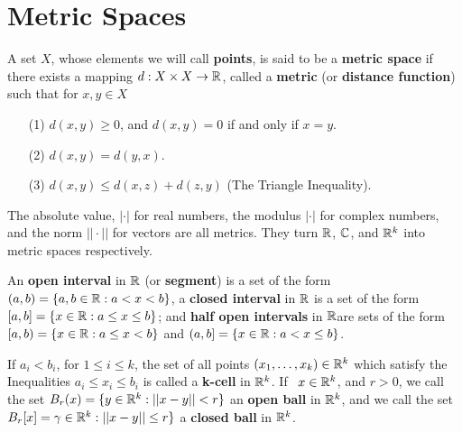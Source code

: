 
\section{Metric Spaces}

\begin{definition}
    A set $X$, whose elements we will call \textbf{points}, is said to be a \textbf{metric space}
    if there exists a mapping $d:X \times X \rightarrow \mathbb{R}$, called a \textbf{metric} (or
    \textbf{distance function}) such that for  $x,y \in X$
         \begin{enumerate}
             \item[(1)] $d(x,y) \geq 0$, and $d(x,y)=0$ if and only if $x=y$.

             \item[(2)] $d(x,y)=d(y,x)$.

             \item[(3)] $d(x,y) \leq d(x,z)+d(z,y)$ (The Triangle Inequality).
        \end{enumerate}
\end{definition}

\begin{example}
    The absolute value, $|\cdot|$ for real numbers, the modulus  $|\cdot|$ for
    complex numbers, and the norm $||\cdot||$ for vectors are all metrics. They
    turn  $\mathbb{R}$,  $\mathbb{C}$, and  $\mathbb{R}^k$ into metric spaces respectively.
\end{example}

\begin{definition}
    An \textbf{open interval} in $\mathbb{R}$ (or \textbf{segment}) is a set of the form $(a,b)=\{a,b \in \mathbb{R}: a<x<b\}$,
    a \textbf{closed interval} in $\mathbb{R}$ is a set of the form $[a,b]=\{x \in \mathbb{R}: a \leq x \leq b\}$; and
    \textbf{half open intervals} in $\mathbb{R} $are sets of the form  $[a,b)=\{x \in \mathbb{R}: a \leq x <b\}$ and
    $(a,b]=\{x \in \mathbb{R}: a<x \leq b\}$.

    If  $a_i < b_i$, for  $1 \leq i \leq k$, the set of all points  $(x_1, \dots, x_k) \in \mathbb{R}^k$ which
    satisfy the Inequalities $a_i \leq x_i \leq b_i$ is called a \textbf{k-cell} in $\mathbb{R}^k$. If \
    $x \in \mathbb{R}^k$, and  $r>0$, we call the set  $B_r(x)=\{y \in \mathbb{R}^k: ||x-y||<r\}$ an
    \textbf{open ball} in $\mathbb{R}^k$,  and we call the set  $B_r[x]=\gamma \in \mathbb{R}^k: ||x-y|| \leq r\}$ a
    \textbf{closed ball} in $\mathbb{R}^k$.
\end{definition}

